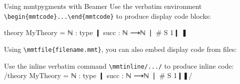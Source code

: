 \documentclass{beamer}
\begin{document}
	\begin{frame}[fragile]{Using mmtpygments with Beamer}
		Use the verbatim environment \verb|\begin{mmtcode}...\end{mmtcode}| to produce display code blocks:
		\begin{mmtcode}
theory MyTheory =
	ℕ : type ❙
	succ : ℕ ⟶ℕ ❘ # S 1❙
❚
		\end{mmtcode}

		Using \verb|\mmtfile{filename.mmt}|, you can also embed display code from files:

		Use the inline verbatim command \verb|\mmtinline/.../| to produce inline code: \mmtinline/theory MyTheory = ℕ : type ❙ succ : ℕ ⟶ℕ ❘ # S 1❙❚/
	\end{frame}
\end{document}
